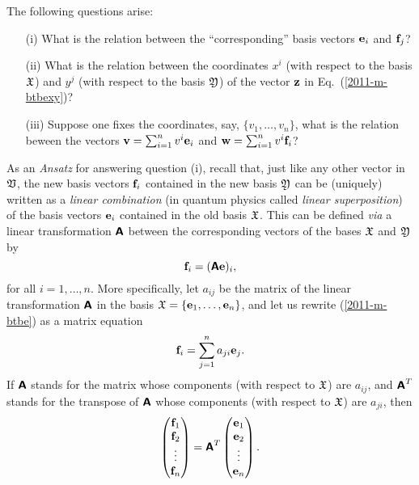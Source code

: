 The following questions arise:
\begin{itemize}
\item[(i)]
What is the relation between the ``corresponding'' basis vectors ${\bf e}_i$ and ${\bf f}_j$?
\item[(ii)]
What is the relation between the coordinates $x^i$ (with respect to the basis  ${\frak X}$) and $y^j$ (with respect to the basis  ${\frak Y}$)  of the vector ${\bf z}$ in Eq.~(\ref{2011-m-btbexy})?
\item[(iii)]
Suppose one fixes the coordinates, say, $\{
{v}_1,
\ldots ,
{v}_n
\}$, what is the relation beween the vectors
${\bf v}=
\sum_{i=1}^n v^i{\bf e}_i
$
and
${\bf w}=
\sum_{i=1}^n v^i{\bf f}_i
$?
\end{itemize}

As an {\it Ansatz} for answering question (i), recall that, just like any other vector in ${\frak V}$,
the new basis vectors ${\bf f}_i$ contained in the new basis ${\frak Y}$
can be (uniquely) written as a {\em linear combination}
(in quantum physics called {\em linear superposition})
of the basis vectors
${\bf e}_i$ contained in the old  basis ${\frak X}$.
This can be defined {\it via}
a linear transformation $\textsf{\textbf{A}}$ between the corresponding vectors of the bases
 ${\frak X}$ and
${\frak Y}$ by
\begin{equation}
{\bf f}_i= (\textsf{\textbf{A}}{\bf e})_i
,
\label{2011-m-btbe}
\end{equation}
for all $i=1, \ldots , n$.
%
More specifically, let $a_{ij}$ be the matrix of the linear transformation $\textsf{\textbf{A}}$
in the basis
${\frak X}
=
\{
{\bf e}_1,
\ldots ,
{\bf e}_n
\}$,
and let us rewrite (\ref{2011-m-btbe}) as a matrix equation
\begin{equation}
{\bf f}_i= \sum_{j=1}^n a_{ji} {\bf e}_j
.
\label{2011-m-btbe-r}
\end{equation}
If $\textsf{\textbf{A}}$ stands for the matrix whose components (with respect to ${\frak X}$) are  $a_{ij}$,
and $\textsf{\textbf{A}}^T$ stands for the transpose of $\textsf{\textbf{A}}$
whose components (with respect to ${\frak X}$) are  $a_{ji}$,
then
\begin{equation}
\begin{pmatrix}
{\bf f}_1\\
{\bf f}_2\\
\vdots\\
{\bf f}_n
\end{pmatrix}
= \textsf{\textbf{A}}^T
\begin{pmatrix}
{\bf e}_1\\
{\bf e}_2\\
\vdots\\
{\bf e}_n
\end{pmatrix}
.
\label{2011-m-btbe-r1}
\end{equation}

